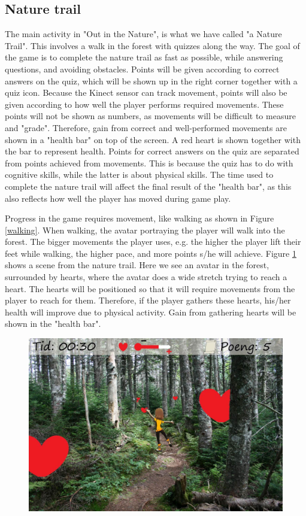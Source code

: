 \subsection{Nature trail}
The main activity in "Out in the Nature", is what we have called "a Nature Trail". This involves a walk in the forest with quizzes along the way. The goal of the game is to complete the nature trail as fast as possible, while answering questions, and avoiding obstacles. Points will be given according to correct answers on the quiz, which will be shown up in the right corner together with a quiz icon. Because the Kinect sensor can track movement, points will also be given according to how well the player performs required movements. These points will not be shown as numbers, as movements will be difficult to measure and "grade". Therefore, gain from correct and well-performed movements are shown in a "health bar" on top of the screen. A red heart is shown together with the bar to represent health. Points for correct answers on the quiz are separated from points achieved from movements. This is because the quiz has to do with cognitive skills, while the latter is about physical skills. The time used to complete the nature trail will affect the final result of the "health bar", as this also reflects how well the player has moved during game play.   

Progress in the game requires movement, like walking as shown in Figure \ref{walking}. When walking, the avatar portraying the player will walk into the forest. The bigger movements the player uses, e.g. the higher the player lift their feet while walking, the higher pace, and more points s/he will achieve. Figure \ref{fig:hearts} shows a scene from the nature trail. Here we see an avatar in the forest, surrounded by hearts, where the avatar does a wide stretch trying to reach a heart. The hearts will be positioned so that it will require movements from the player to reach for them. Therefore, if the player gathers these hearts, his/her health will improve due to physical activity. Gain from gathering hearts will be shown in the "health bar".   

\begin{figure} [H]
\centering
\includegraphics[scale=0.5]{hjerter.jpg}
\caption[Nature trail - stretching]{}
\label{fig:hearts}
\end{figure}

